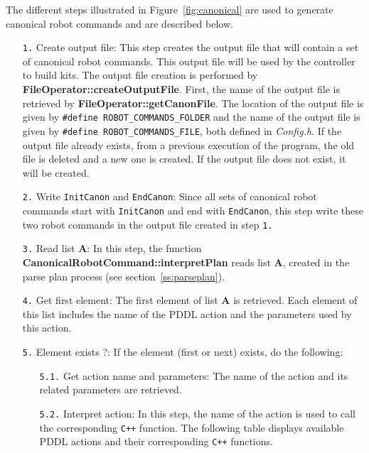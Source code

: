 The different steps illustrated in Figure~\ref{fig:canonical} are used to generate canonical robot commands and are described below.
\begin{itemize}
\item[\texttt{1.}] Create output file: This step creates the output file that will contain a set of canonical robot commands. This output file will be used by the controller to build kits. The output file creation is performed by \textbf{\footnotesize{FileOperator::createOutputFile}}. First, the name of the output file is retrieved by \textbf{\footnotesize{FileOperator::getCanonFile}}. The location of the output file is given by \texttt{\footnotesize{\#define ROBOT\_COMMANDS\_FOLDER}} and the name of the output file is given by \texttt{\footnotesize{\#define ROBOT\_COMMANDS\_FILE}}, both defined in \textit{\footnotesize{Config.h}}. If the output file already exists, from a previous execution of the program, the old file is deleted and a new one is created. If the output file does not exist, it will be created.
\item[\texttt{2.}] Write \texttt{InitCanon} and \texttt{EndCanon}: Since all sets of canonical robot commands start with \texttt{InitCanon} and end with \texttt{EndCanon}, this step write these two robot commands in the output file created in step \texttt{1.}
\item[\texttt{3.}] Read list \textbf{A}: In this step, the function \textbf{\footnotesize{CanonicalRobotCommand::interpretPlan}} reads list \textbf{A}, created in the parse plan process (see section~\ref{ss:parseplan}).
\item[\texttt{4.}] Get first element: The first element of list \textbf{A} is retrieved. Each element of this list includes the name of the PDDL action and the parameters used by this action.
\item[\texttt{5.}] Element exists ?: If the element (first or next) exists, do the following:
\begin{itemize}
\item[\texttt{5.1.}] Get action name and parameters: The name of the action and its related parameters are retrieved.
\item[\texttt{5.2.}] Interpret action: In this step, the name of the action is used to call the corresponding \verb!C++! function. The following table displays available PDDL actions and their corresponding \verb!C++! functions.\\
    \begin{center}
    \begin{tabular}{ l|l }

\end{tabular}
\end{center}
\end{itemize}
\end{itemize}
